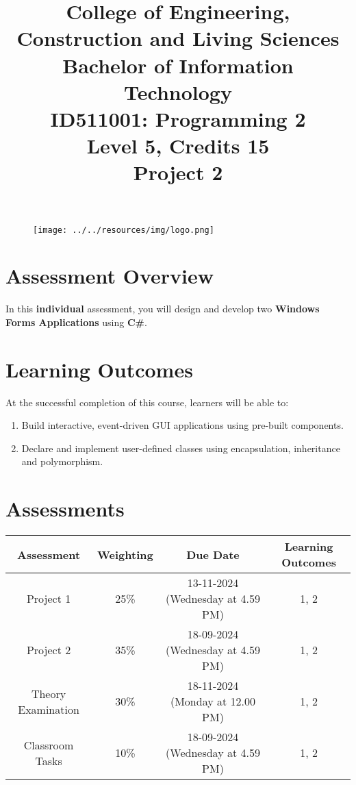 \documentclass{article}
\author{}
\begin{document}
\begin{figure}
    \centering
    \texttt{[image: ../../resources/img/logo.png]}
\end{figure}

\title{College of Engineering, Construction and Living Sciences\\Bachelor of Information Technology\\ID511001: Programming 2\\Level 5, Credits 15\\\textbf{Project 2}}
\date{}
\maketitle

\section*{Assessment Overview}
In this \textbf{individual} assessment, you will design and develop two \textbf{Windows Forms Applications} using \textbf{C\#}. 

\section*{Learning Outcomes}
At the successful completion of this course, learners will be able to:
\begin{enumerate}
    \item Build interactive, event-driven GUI applications using pre-built components.
    \item Declare and implement user-defined classes using encapsulation, inheritance and polymorphism.
\end{enumerate}

\section*{Assessments}
\renewcommand{\arraystretch}{1.5}
\begin{tabular}{|c|c|c|c|}
	\hline
	\textbf{Assessment}                                 & \textbf{Weighting} & \textbf{Due Date}            & \textbf{Learning Outcomes} \\ \hline
	\small Project 1 & \small 25\%        & \small \small 13-11-2024 (Wednesday at 4.59 PM)  & \small 1, 2                   \\ \hline
	\small Project 2  & \small 35\%        & \small 18-09-2024 (Wednesday at 4.59 PM)   & \small 1, 2                   \\ \hline
	\small Theory Examination                        & \small 30\%        & \small 18-11-2024 (Monday at 12.00 PM)  & \small 1, 2                   \\ \hline
	\small Classroom Tasks                      & \small 10\%        & \small 18-09-2024 (Wednesday at 4.59 PM)  & \small 1, 2                   \\ \hline
\end{tabular} 
\end{document}

